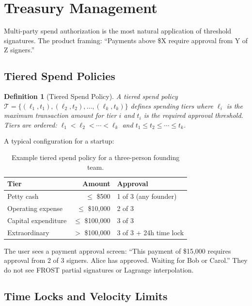 \documentclass[11pt,a4paper]{article}
\newtheorem{definition}{Definition}
\begin{document}
\section{Treasury Management}\label{sec:treasury}

Multi-party spend authorization is the most natural application of
threshold signatures. The product framing: ``Payments above \$X require
approval from Y of Z signers.''

\subsection{Tiered Spend Policies}

\begin{definition}[Tiered Spend Policy]
A tiered spend policy $\mathcal{T} = \{(\ell_1, t_1), (\ell_2, t_2), \ldots, (\ell_k, t_k)\}$
defines spending tiers where $\ell_i$ is the maximum transaction amount for
tier $i$ and $t_i$ is the required approval threshold. Tiers are ordered:
$\ell_1 < \ell_2 < \cdots < \ell_k$ and $t_1 \leq t_2 \leq \cdots \leq t_k$.
\end{definition}

A typical configuration for a startup:

\begin{table}[H]
\centering
\caption{Example tiered spend policy for a three-person founding team.}
\label{tab:tiers}
\begin{tabular}{lrl}
\toprule
\textbf{Tier} & \textbf{Amount} & \textbf{Approval} \\
\midrule
Petty cash & $\leq$ \$500 & 1 of 3 (any founder) \\
Operating expense & $\leq$ \$10,000 & 2 of 3 \\
Capital expenditure & $\leq$ \$100,000 & 3 of 3 \\
Extraordinary & $>$ \$100,000 & 3 of 3 + 24h time lock \\
\bottomrule
\end{tabular}
\end{table}

The user sees a payment approval screen: ``This payment of \$15,000 requires
approval from 2 of 3 signers. Alice has approved. Waiting for Bob or Carol.''
They do not see FROST partial signatures or Lagrange interpolation.

\subsection{Time Locks and Velocity Limits}
\end{document}
